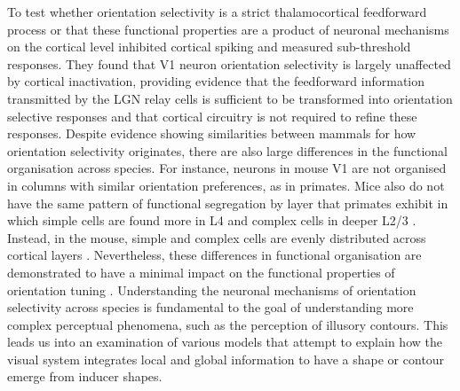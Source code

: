 \documentclass[12pt]{article}
\begin{document}
\bigbreak
To test whether orientation selectivity is a strict thalamocortical feedforward process or that these functional properties are a product of neuronal mechanisms on the cortical level \textcite{fersterOrientationSelectivityThalamic1996} inhibited cortical spiking and measured sub-threshold responses. They found that V1 neuron orientation selectivity is largely unaffected by cortical inactivation, providing evidence that the feedforward information transmitted by the LGN relay cells is sufficient to be transformed into orientation selective responses and that cortical circuitry is not required to refine these responses. Despite evidence showing similarities between mammals for how orientation selectivity originates, there are also large differences in the functional organisation across species. For instance, neurons in mouse V1 are not organised in columns with similar orientation preferences, as in primates. Mice also do not have the same pattern of functional segregation by layer that primates exhibit in which simple cells are found more in L4 and complex cells in deeper L2/3 \autocite{martinezReceptiveFieldStructure2005}. Instead, in the mouse, simple and complex cells are evenly distributed across cortical layers \autocite{niellHighlySelectiveReceptive2008}. Nevertheless, these differences in functional organisation are demonstrated to have a minimal impact on the functional properties of orientation tuning \autocite{hooserOrientationSelectivityOrientation2005}. Understanding the neuronal mechanisms of orientation selectivity across species is fundamental to the goal of understanding more complex perceptual phenomena, such as the perception of illusory contours. This leads us into an examination of various models that attempt to explain how the visual system integrates local and global information to have a shape or contour emerge from inducer shapes.
\end{document}
